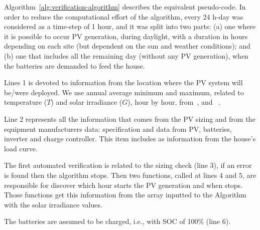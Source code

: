 \documentclass[review]{elsarticle}
\begin{document}
Algorithm~\ref{alg:verification-algorithm} describes the equivalent pseudo-code. %
In order to reduce the computational effort of the algorithm,
every 24 h-day was considered as a time-step of 1 hour, and it was split into two parts: (a) one where it is possible to occur PV generation, during daylight, with a duration in hours depending on each site (but dependent on the sun and weather conditions); and (b) one that includes all the remaining day (without any PV generation), when the batteries are demanded to feed the house.

Lines 1 is devoted to information from the location where the PV system will be/were deployed. We use annual average minimum and maximum, related to temperature ($T$) and solar irradiance ($G$), hour by hour, from~\citep{Temperature}, and ~\citep{Irradiance}.

Line 2 represents all the information that comes from the PV sizing and from the equipment manufacturers data: specification and data from PV, batteries, inverter and charge controller. This item includes as information from the house's load curve.

The first automated verification is related to the sizing check (line 3), if an error is found then the algorithm stops. Then two functions, called at lines 4 and 5, are responsible for discover which hour starts the PV generation and when stops. Those functions get this information from the array inputted to the Algorithm with the solar irradiance values.

The batteries are assumed to be charged, i.e., with SOC of 100\% (line 6).
\end{document}

